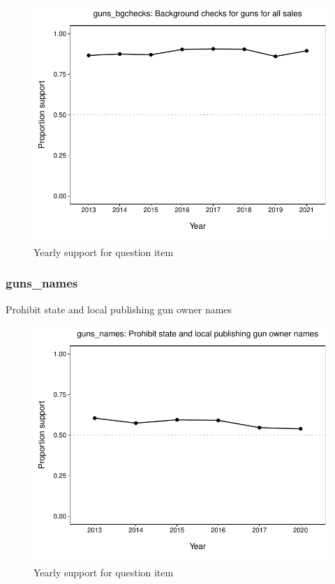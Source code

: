 \documentclass[
  12pt]{article}
\begin{document}
\begin{figure}

{\centering \includegraphics{error-checking_files/figure-latex/unnamed-chunk-3-13} 

}

\caption{Yearly support for question item}\label{fig:unnamed-chunk-3-13}
\end{figure}

\hypertarget{guns_names}{%
\subsubsection{guns\_names}\label{guns_names}}

Prohibit state and local publishing gun owner names

\begin{figure}

{\centering \includegraphics{error-checking_files/figure-latex/unnamed-chunk-3-14} 

}

\caption{Yearly support for question item}\label{fig:unnamed-chunk-3-14}
\end{figure}
\end{document}
